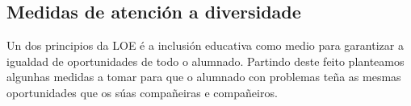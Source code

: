 \subsection{Medidas de atención a diversidade}\label{sec:diversidade}

Un dos principios da LOE \cite{lomce} é a inclusión educativa como medio para garantizar a igualdad de oportunidades de todo o alumnado. Partindo deste feito planteamos algunhas medidas a tomar para que o alumnado con problemas teña as mesmas oportunidades que os súas compañeiras e compañeiros.
